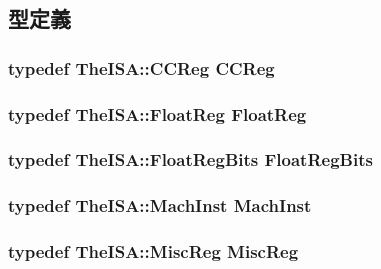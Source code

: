 \subsection{型定義}
\hypertarget{classSimpleThread_a0c9de550a32808e6a25b54b6c791d5ab}{
\subsubsection[{CCReg}]{\setlength{\rightskip}{0pt plus 5cm}typedef TheISA::CCReg {\bf CCReg}}}
\label{classSimpleThread_a0c9de550a32808e6a25b54b6c791d5ab}
\hypertarget{classSimpleThread_a75484259f1855aabc8d74c6eb1cfe186}{
\subsubsection[{FloatReg}]{\setlength{\rightskip}{0pt plus 5cm}typedef TheISA::FloatReg {\bf FloatReg}}}
\label{classSimpleThread_a75484259f1855aabc8d74c6eb1cfe186}
\hypertarget{classSimpleThread_aab5eeae86499f9bfe15ef79360eccc64}{
\subsubsection[{FloatRegBits}]{\setlength{\rightskip}{0pt plus 5cm}typedef TheISA::FloatRegBits {\bf FloatRegBits}}}
\label{classSimpleThread_aab5eeae86499f9bfe15ef79360eccc64}
\hypertarget{classSimpleThread_a4617f528417b8f55f809ae0988284c9b}{
\subsubsection[{MachInst}]{\setlength{\rightskip}{0pt plus 5cm}typedef TheISA::MachInst {\bf MachInst}}}
\label{classSimpleThread_a4617f528417b8f55f809ae0988284c9b}
\hypertarget{classSimpleThread_aaf5f073a387db0556d1db4bcc45428bc}{
\subsubsection[{MiscReg}]{\setlength{\rightskip}{0pt plus 5cm}typedef TheISA::MiscReg {\bf MiscReg}}}
